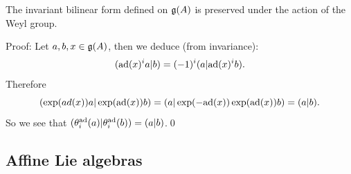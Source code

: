 \begin{dang}
    \begin{lemma}
        The invariant bilinear form defined on $\mathfrak{g}(A)$ is preserved under the action of the Weyl group.
    \end{lemma}
\end{dang}
Proof: Let $a,b,x\in\mathfrak{g}(A)$, then we deduce (from invariance):
\begin{equation}
    (\text{ad}(x)^{i}a|b) = (-1)^i(a| \text{ad}(x)^{i}b).
\end{equation}
Therefore 
\begin{equation}
    (\exp(ad(x))a|\exp(\text{ad}(x))b) = (a|\exp(-\text{ad}(x))\exp(\text{ad}(x))b) = (a|b).
\end{equation}
So we see that $(\theta_i^{\text{ad}}(a)|\theta_i^{\text{ad}}(b))=(a|b)$.\qed

\subsection{Affine Lie algebras}
